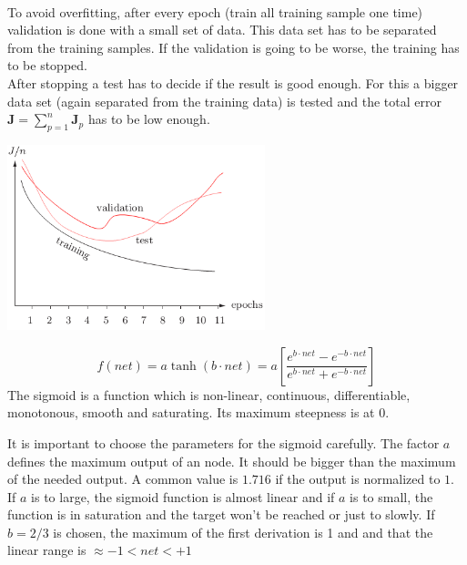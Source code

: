  \begin{minipage}{10cm}
 \\
 To avoid overfitting, after every epoch (train all training sample one time) validation is done with a small set of data.
 This data set has to be separated from the training samples.
 If the validation is going to be worse, the training has to be stopped.\\
 
 After stopping a test has to decide if the result is good enough. For this a bigger data set (again separated from the training data) is tested and 
 the total error $\bm J = \sum\limits_{p=1}^n \bm J_p$ has to be low enough.
 \end{minipage}
 \hspace{5mm}
 \begin{minipage}{8cm}
 \includegraphics[width=7.5cm]{./images/stopCriterion.png}
 \end{minipage}
 

 $$ f(net)=a \tanh(b \cdot net)= a \left[\frac{e^{b\cdot net}-e^{-b \cdot net}}{e^{b\cdot net}+ e^{-b\cdot net}}\right]$$
  The sigmoid is a function which is non-linear, continuous, differentiable, monotonous, smooth and saturating. Its maximum steepness is at 0.
  
  \begin{center}
      
  \end{center}
    
  It is important to choose the parameters for the sigmoid carefully. The factor $a$ defines the maximum output of an node.
  It should be bigger than the maximum of the needed output. A common value is $1.716$ if the output is normalized to $1$.
  If $a$ is to large, the sigmoid function is almost linear and if $a$ is to small, the function is in saturation and the target won't be reached or just to slowly.
  If $b=2/3$ is chosen, the maximum of the first derivation is 1 and and that the linear range is $\approx -1 < net < +1$ 
